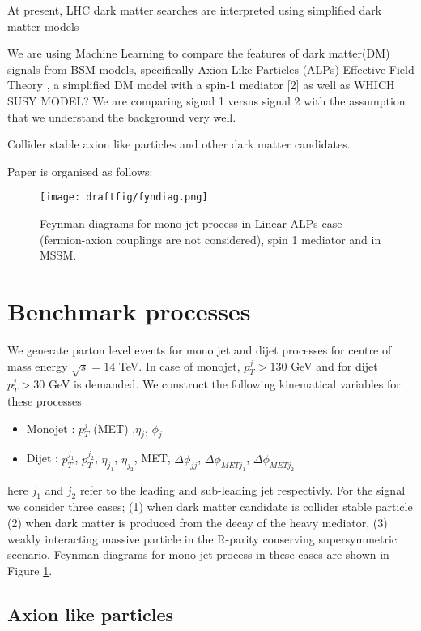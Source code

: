 \documentclass[aps,onecolumn,showpacs,superscriptaddress,groupedaddress,nofootinbib,preprint]{revtex4-1}
\begin{document}
At present, LHC dark matter searches are interpreted using simplified dark matter models

We are using Machine Learning to compare the features of dark matter(DM) signals from BSM models,
specifically Axion-Like Particles (ALPs) Effective Field Theory \cite{Mimasu:2014nea,Brivio:2017ije}, a simplified DM model with a
spin-1 mediator [2] as well as WHICH SUSY MODEL? We are comparing signal 1 versus 
signal 2 with the assumption that we understand the background very well. 

Collider stable axion like particles and other dark matter candidates.

Paper is organised as follows:

\begin{figure}
\centering
\texttt{[image: draftfig/fyndiag.png]}
\caption{Feynman diagrams for mono-jet process in Linear ALPs case (fermion-axion couplings are not considered), spin 1 mediator and in MSSM\label{fyndiag}.}
\end{figure}

\section{Benchmark processes}
We generate parton level events for mono jet and  dijet processes  for centre of mass energy $\sqrt{s}=14$ TeV. In case of monojet, $p_T^j > 130$ GeV and for dijet $p_T^j > 30$ GeV is demanded. We construct the following kinematical variables for these processes
\begin{itemize}
\item Monojet : $p_T^j$ (MET) ,$\eta_j$, $\phi_j$
\item Dijet : $p_T^{j_1}$, $p_T^{j_2}$, $\eta_{j_1}$, $\eta_{j_2}$, MET, $\Delta \phi_{jj}$, $\Delta \phi_{MET j_1}$, $\Delta \phi_{MET j_2}$
\end{itemize}
here $j_1$ and $j_2$ refer to the leading and sub-leading jet respectivly. For the signal we consider three cases; (1) when dark matter candidate is collider stable particle (2) when dark matter is produced from the decay of the heavy mediator, (3) weakly interacting massive particle in the R-parity conserving supersymmetric scenario. Feynman diagrams for mono-jet process in these cases are shown in Figure \ref{fyndiag}. 

\subsection{Axion like particles}
\end{document}
